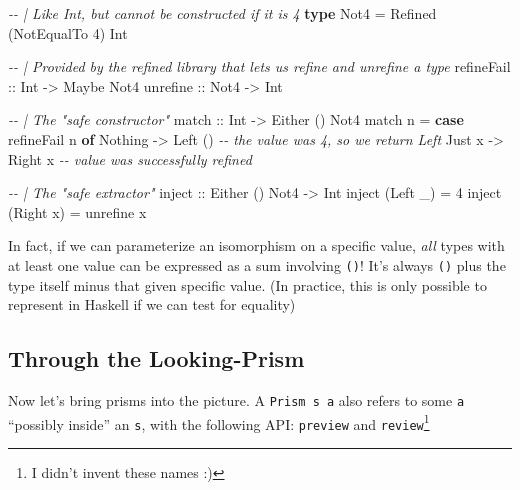 \documentclass[]{article}
\newenvironment{Shaded}{}{}
\newcommand{\CommentTok}[1]{\textcolor[rgb]{0.38,0.63,0.69}{\textit{#1}}}
\newcommand{\DataTypeTok}[1]{\textcolor[rgb]{0.56,0.13,0.00}{#1}}
\newcommand{\DecValTok}[1]{\textcolor[rgb]{0.25,0.63,0.44}{#1}}
\newcommand{\KeywordTok}[1]{\textcolor[rgb]{0.00,0.44,0.13}{\textbf{#1}}}
\newcommand{\NormalTok}[1]{#1}
\newcommand{\OtherTok}[1]{\textcolor[rgb]{0.00,0.44,0.13}{#1}}
\begin{document}
\begin{Shaded}
\begin{Highlighting}[]
\CommentTok{{-}{-} | Like \textasciigrave{}Int\textasciigrave{}, but cannot be constructed if it is 4}
\KeywordTok{type} \DataTypeTok{Not4} \OtherTok{=} \DataTypeTok{Refined}\NormalTok{ (}\DataTypeTok{NotEqualTo} \DecValTok{4}\NormalTok{) }\DataTypeTok{Int}

\CommentTok{{-}{-} | Provided by the \textquotesingle{}refined\textquotesingle{} library that lets us refine and unrefine a type}
\OtherTok{refineFail ::} \DataTypeTok{Int}  \OtherTok{{-}>} \DataTypeTok{Maybe} \DataTypeTok{Not4}
\OtherTok{unrefine   ::} \DataTypeTok{Not4} \OtherTok{{-}>} \DataTypeTok{Int}


\CommentTok{{-}{-} | The "safe constructor"}
\OtherTok{match ::} \DataTypeTok{Int} \OtherTok{{-}>} \DataTypeTok{Either}\NormalTok{ () }\DataTypeTok{Not4}
\NormalTok{match n }\OtherTok{=} \KeywordTok{case}\NormalTok{ refineFail n }\KeywordTok{of}
    \DataTypeTok{Nothing} \OtherTok{{-}>} \DataTypeTok{Left}\NormalTok{ ()          }\CommentTok{{-}{-} the value was 4, so we return \textasciigrave{}Left\textasciigrave{}}
    \DataTypeTok{Just}\NormalTok{ x  }\OtherTok{{-}>} \DataTypeTok{Right}\NormalTok{ x          }\CommentTok{{-}{-} value was successfully refined}

\CommentTok{{-}{-} | The "safe extractor"}
\OtherTok{inject ::} \DataTypeTok{Either}\NormalTok{ () }\DataTypeTok{Not4} \OtherTok{{-}>} \DataTypeTok{Int}
\NormalTok{inject (}\DataTypeTok{Left}\NormalTok{  \_) }\OtherTok{=} \DecValTok{4}
\NormalTok{inject (}\DataTypeTok{Right}\NormalTok{ x) }\OtherTok{=}\NormalTok{ unrefine x}
\end{Highlighting}
\end{Shaded}

In fact, if we can parameterize an isomorphism on a specific value, \emph{all}
types with at least one value can be expressed as a sum involving \texttt{()}!
It's always \texttt{()} plus the type itself minus that given specific value.
(In practice, this is only possible to represent in Haskell if we can test for
equality)

\hypertarget{through-the-looking-prism}{%
\subsection{Through the Looking-Prism}\label{through-the-looking-prism}}

Now let's bring prisms into the picture. A
\texttt{Prism\textquotesingle{}\ s\ a} also refers to some \texttt{a} ``possibly
inside'' an \texttt{s}, with the following API: \texttt{preview} and
\texttt{review}\footnote{I didn't invent these names :)}
\end{document}
